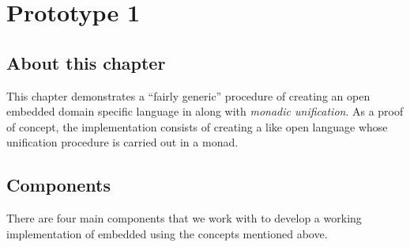 \documentclass[thesis-solanki.tex]{subfiles}
\begin{document}
\chapter{Prototype 1}{\label{proto1}}



\section{About this chapter}

This chapter demonstrates a ``fairly generic''
procedure of creating an open embedded domain specific language in  along
with \textit{monadic unification}. As a proof of concept, the implementation consists of creating a  like open language
whose unification procedure is carried out in a monad.


\section{Components}
There are four main components
that we work with to develop a working implementation of embedded 
using the concepts mentioned above.
\end{document}
